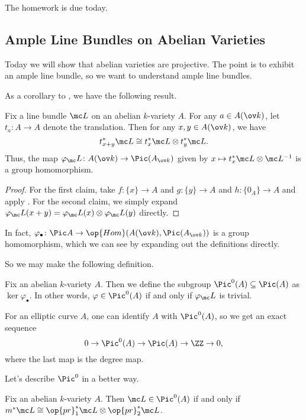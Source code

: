 \documentclass[../notes.tex]{subfiles}
\begin{document}
The homework is due today.

\subsection{Ample Line Bundles on Abelian Varieties}
Today we will show that abelian varieties are projective. The point is to exhibit an ample line bundle, so we want to understand ample line bundles.

As a corollary to , we have the following result.
\begin{theorem} \label{thm:square}
	Fix a line bundle $\mc L$ on an abelian $k$-variety $A$. For any $a\in A(\ov k)$, let $t_a\colon A\to A$ denote the translation. Then for any $x,y\in A(\ov k)$, we have
	\[t_{x+y}^*\mc L\cong t_x^*\mc L\otimes t_y^*\mc L.\]
	Thus, the map $\varphi_\mc L\colon A(\ov k)\to\Pic(A_{\ov k})$ given by $x\mapsto t_x^*\mc L\otimes\mc L^{-1}$ is a group homomorphism.
\end{theorem}
\begin{proof}
	For the first claim, take $f\colon\{x\}\to A$ and $g\colon\{y\}\to A$ and $h\colon\{0_A\}\to A$ and apply . For the second claim, we simply expand $\varphi_\mc L(x+y)=\varphi_\mc L(x)\otimes\varphi_\mc L(y)$ directly.
\end{proof}
\begin{remark}
	In fact, $\varphi_\bullet\colon\Pic A\to\op{Hom}(A(\ov k),\Pic(A_{\ov k}))$ is a group homomorphism, which we can see by expanding out the definitions directly.
\end{remark}
So we may make the following definition.
\begin{definition}
	Fix an abelian $k$-variety $A$. Then we define the subgroup $\Pic^0(A)\subseteq\Pic(A)$ as $\ker\varphi_\bullet$. In other words, $\varphi\in\Pic^0(A)$ if and only if $\varphi_\mc L$ is trivial.
\end{definition}
\begin{example}
	For an elliptic curve $A$, one can identify $A$ with $\Pic^0(A)$, so we get an exact sequence
	\[0\to\Pic^0(A)\to\Pic(A)\to\ZZ\to0,\]
	where the last map is the degree map.%
\end{example}
Let's describe $\Pic^0$ in a better way.
\begin{lemma} \label{lem:better-pic0}
	Fix an abelian $k$-variety $A$. Then $\mc L\in\Pic^0(A)$ if and only if $m^*\mc L\cong\op{pr}_1^*\mc L\otimes\op{pr}_2^*\mc L$.
\end{lemma}
\end{document}
